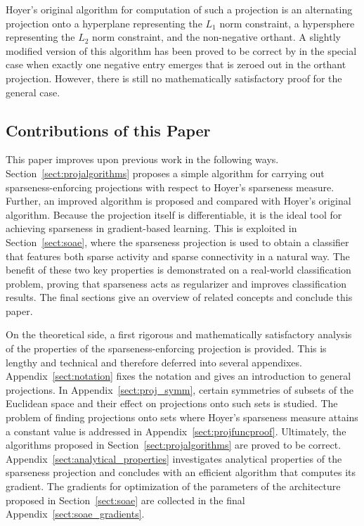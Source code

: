 \documentclass[twoside,11pt]{article}
\newcommand{\0}{\mathcal{O}}
\begin{document}
Hoyer's original algorithm for computation of such a projection is an alternating projection onto a hyperplane representing the $L_1$ norm constraint, a hypersphere representing the $L_2$ norm constraint, and the non-negative orthant.
A slightly modified version of this algorithm has been proved to be correct by \citet{Theis2005} in the special case when exactly one negative entry emerges that is zeroed out in the orthant projection.
However, there is still no mathematically satisfactory proof for the general case.

\subsection{Contributions of this Paper}
This paper improves upon previous work in the following ways.
Section~\ref{sect:projalgorithms} proposes a simple algorithm for carrying out sparseness-enforcing projections with respect to Hoyer's sparseness measure.
Further, an improved algorithm is proposed and compared with Hoyer's original algorithm.
Because the projection itself is differentiable, it is the ideal tool for achieving sparseness in gradient-based learning.
This is exploited in Section~\ref{sect:soae}, where the sparseness projection is used to obtain a classifier that features both sparse activity and sparse connectivity in a natural way.
The benefit of these two key properties is demonstrated on a real-world classification problem, proving that sparseness acts as regularizer and improves classification results.
The final sections give an overview of related concepts and conclude this paper.

On the theoretical side, a first rigorous and mathematically satisfactory analysis of the properties of the sparseness-enforcing projection is provided.
This is lengthy and technical and therefore deferred into several appendixes.
Appendix~\ref{sect:notation} fixes the notation and gives an introduction to general projections.
In Appendix~\ref{sect:proj_symm}, certain symmetries of subsets of the Euclidean space and their effect on projections onto such sets is studied.
The problem of finding projections onto sets where Hoyer's sparseness measure attains a constant value is addressed in Appendix~\ref{sect:projfuncproof}.
Ultimately, the algorithms proposed in Section~\ref{sect:projalgorithms} are proved to be correct.
Appendix~\ref{sect:analytical_properties} investigates analytical properties of the sparseness projection and concludes with an efficient algorithm that computes its gradient.
The gradients for optimization of the parameters of the architecture proposed in Section~\ref{sect:soae} are collected in the final Appendix~\ref{sect:soae_gradients}.
\end{document}
